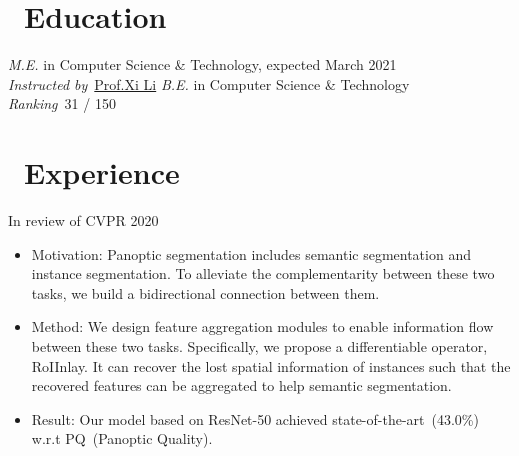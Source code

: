\documentclass{resume}
\begin{document}

\section{\faGraduationCap\ Education}
\textit{M.E.} in  Computer Science \& Technology, expected March 2021\\
\textit{Instructed by}\ \href{https://person.zju.edu.cn/xilics}{Prof.Xi Li}
\textit{B.E.} in Computer Science \& Technology\\
\textit{Ranking}\ 31 / 150

\section{\faUsers\ Experience}
\role{} {In review of CVPR 2020}
\begin{itemize}
	\item Motivation: Panoptic segmentation includes semantic segmentation and instance segmentation. To alleviate the complementarity between these two tasks, we build a bidirectional connection between them. %
	\item Method: We design feature aggregation modules to enable information flow between these two tasks. Specifically, we propose a differentiable operator, RoIInlay. It can recover the lost spatial information of instances such that the recovered features can be aggregated to help semantic segmentation. 
	\item Result: Our model based on ResNet-50 achieved state-of-the-art~(43.0\%) w.r.t PQ~(Panoptic Quality). 
\end{itemize}
\end{document}
